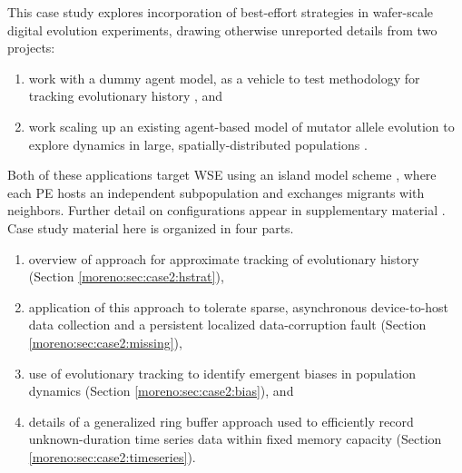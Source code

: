 This case study explores incorporation of best-effort strategies in wafer-scale digital evolution experiments, drawing otherwise unreported details from two projects:
\begin{enumerate}
\item work with a dummy agent model, as a vehicle to test methodology for tracking evolutionary history \cite{singhvi2025scalable}, and
\item work scaling up an existing agent-based model of mutator allele evolution to explore dynamics in large, spatially-distributed populations \cite{raynes2018sign}.
\end{enumerate}
Both of these applications target WSE using an island model scheme \cite{bennett1999building}, where each PE hosts an independent subpopulation and exchanges migrants with neighbors.
Further detail on configurations appear in supplementary material \cite{moreno_2026_trust}.
Case study material here is organized in four parts.
\begin{enumerate}
\item overview of approach for approximate tracking of evolutionary history (Section \ref{moreno:sec:case2:hstrat}),
\item application of this approach to tolerate sparse, asynchronous device-to-host data collection and a persistent localized data-corruption fault (Section \ref{moreno:sec:case2:missing}),
\item use of evolutionary tracking to identify emergent biases in population dynamics (Section \ref{moreno:sec:case2:bias}), and
\item details of a generalized ring buffer approach used to efficiently record unknown-duration time series data within fixed memory capacity (Section \ref{moreno:sec:case2:timeseries}).
\end{enumerate}




